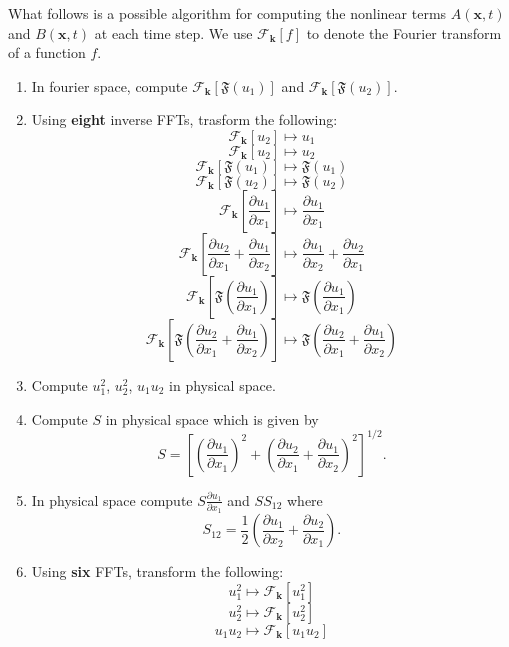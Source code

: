 \documentclass[11pt,a4paper]{article}
\begin{document}
What follows is a possible algorithm for computing the nonlinear terms $A(\boldsymbol{x}, t)$ and $B(\boldsymbol{x},t)$ at each time step. We use $\mathcal{F}_{\boldsymbol{k}}[{f}]$ to denote the Fourier transform of a function $f$.
\begin{enumerate}
\item In fourier space, compute $\mathcal{F}_{\boldsymbol{k}}\left[{\mathfrak{F}\left({u}_{1}\right)}\right]$ and $\mathcal{F}_{\boldsymbol{k}}\left[{\mathfrak{F}\left({u}_{2}\right)}\right]$.
\item Using \textbf{eight} inverse FFTs, trasform the following:
$$\mathcal{F}_{\boldsymbol{k}}[{u}_{2}] \mapsto {u}_{1}$$
$$\mathcal{F}_{\boldsymbol{k}}[{u}_{2}] \mapsto {u}_{2}$$
$$\mathcal{F}_{\boldsymbol{k}}\left[{\mathfrak{F}\left({u}_{1}\right)}\right] \mapsto \mathfrak{F}\left({u}_{1}\right)$$
$$\mathcal{F}_{\boldsymbol{k}}\left[{\mathfrak{F}\left({u}_{2}\right)}\right]\mapsto \mathfrak{F}\left({u}_{2}\right)$$
$$\mathcal{F}_{\boldsymbol{k}}\left[\frac{\partial u_{1}}{\partial x_1}\right] \mapsto \frac{\partial {u}_{1}}{\partial x_1}$$
$$\mathcal{F}_{\boldsymbol{k}}\left[\frac{\partial u_{2}}{\partial x_1}+\frac{\partial u_{1}}{\partial x_2}\right] \mapsto  \frac{\partial {u}_{1}}{\partial x_2}+\frac{\partial {u}_{2}}{\partial x_1}$$
$$\mathcal{F}_{\boldsymbol{k}}\left[\mathfrak{F}\left(\frac{\partial u_{1}}{\partial x_1}\right)\right] \mapsto \mathfrak{F}\left(\frac{\partial u_{1}}{\partial x_1}\right)$$
$$\mathcal{F}_{\boldsymbol{k}}\left[\mathfrak{F}\left(\frac{\partial u_{2}}{\partial x_1}+\frac{\partial u_{1}}{\partial x_2}\right)\right] \mapsto  \mathfrak{F}\left(\frac{\partial u_{2}}{\partial x_1}+\frac{\partial u_{1}}{\partial x_2}\right)$$
\item Compute $u_1^2$, $u_2^2$, $u_1u_2$ in physical space.
\item Compute $S$ in physical space which is given by
$$S = \left[\left( \frac{\partial {u}_1}{\partial x_1}\right)^2+\left( \frac{\partial {u}_2}{\partial x_1} + \frac{\partial {u}_1}{\partial x_2}\right)^2\right]^{1/2}.$$
\item In physical space compute $S \frac{\partial u_1}{\partial x_1}$ and $S S_{12}$ where
$$S_{12} = \frac{1}{2}\left(\frac{\partial {u}_{1}}{\partial x_2}+\frac{\partial {u}_{2}}{\partial x_1}\right).$$
\item Using \textbf{six} FFTs, transform the following:
$$u_1^2\mapsto \mathcal{F}_{\boldsymbol{k}}\left[{u_1^2}\right]$$
$$u_2^2\mapsto \mathcal{F}_{\boldsymbol{k}}\left[{u_2^2}\right]$$
$$u_1u_2\mapsto \mathcal{F}_{\boldsymbol{k}}\left[{u_1u_2}\right]$$

\end{enumerate}
\end{document}
